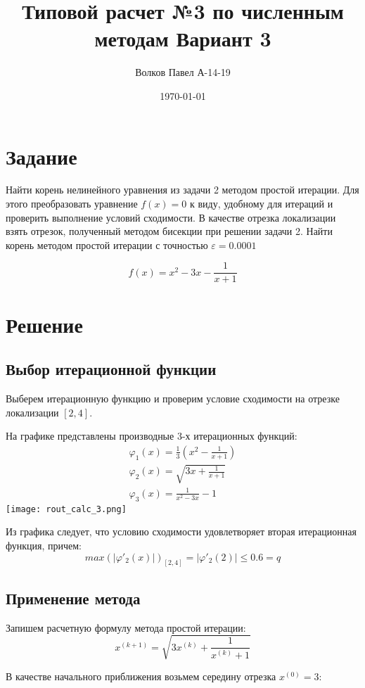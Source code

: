 \documentclass[a4paper,12pt]{report} %
\author{Волков Павел А-14-19}
\title{Типовой расчет №3 по численным методам Вариант 3}
\date{\today}
\begin{document}

\maketitle

\newpage
\section*{Задание}
Найти корень нелинейного уравнения из задачи 2 методом простой итерации. Для этого преобразовать уравнение $f(x) = 0$ к виду, удобному для итераций и проверить выполнение условий сходимости. В качестве отрезка локализации взять отрезок, полученный методом бисекции при решении задачи 2. Найти корень методом простой итерации с точностью $\varepsilon = 0.0001$

\[
	f(x) = x^2 - 3x - \frac{1}{x + 1}
\]
\section*{Решение}

\subsection*{Выбор итерационной функции}

Выберем итерационную функцию и проверим условие сходимости на отрезке локализации $[2, 4]$.

На графике представлены производные 3-х итерационных функций:
\begin{gather*}
	\varphi_1 (x) = \frac{1}{3}(x^2 - \frac{1}{x+1}) \\
	\varphi_2 (x) =  \sqrt{3x + \frac{1}{x+1}}\\
	\varphi_3(x) = \frac{1}{x^2 - 3x} - 1
\end{gather*}
\noindent\texttt{[image: rout\_calc\_3.png]}

\newpage
Из графика следует, что условию сходимости удовлетворяет вторая итерационная функция, причем:
\[
	max(|\varphi'_2(x)|)_{[2, 4]} = |\varphi'_2(2)| \leq 0.6 = q
\]

\subsection*{Применение метода}

Запишем расчетную формулу метода простой итерации:
\[
	x^{(k+1)} = \sqrt{3x^{(k)} + \frac{1}{x^{(k)} + 1}}
\]

\noindent В качестве начального приближения возьмем середину отрезка $x^{(0)} = 3$:
\end{document}
